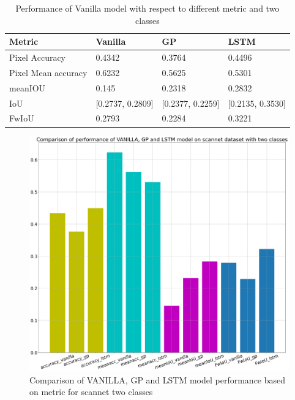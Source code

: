 	\begin{table}[h]
		\begin{center}
			\begin{tabular}{ | l | l | l | p{4cm} |}
				\hline
				
				\cellcolor{purple!30}Metric & \cellcolor{purple!30}Vanilla & \cellcolor{purple!30}GP & \cellcolor{purple!30}LSTM\\ \hline
				Pixel Accuracy & 0.4342 & 0.3764 & 0.4496\\ \hline
				Pixel Mean accuracy & 0.6232 & 0.5625 & 0.5301 \\ \hline
				meanIOU & 0.145 & 0.2318 & 0.2832 \\ \hline
				IoU & [0.2737, 0.2809] & [0.2377, 0.2259] & [0.2135, 0.3530] \\ \hline
				FwIoU & 0.2793 & 0.2284 & 0.3221 \\ \hline
				\hline
			\end{tabular}
			\caption{Performance of Vanilla model with respect to different metric and two classes}
			\label{table:unet_two_classes}
		\end{center}
	\end{table}
	
	
	\begin{figure}
		\centering
		\includegraphics[width=12cm]{images/scannet_performance_two_classes.png}
		\caption{Comparison of VANILLA, GP and LSTM model performance based on metric for scannet two classes}
		\label{fig:unet_model_metric_comparison}
	\end{figure}

